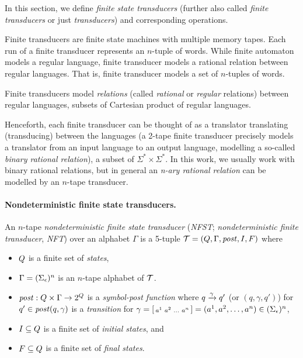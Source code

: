 In this section, we define \emph{finite state transducers} (further also called \emph{finite transducers} or just \emph{transducers}) and corresponding operations.

Finite transducers are finite state machines with multiple memory tapes.
Each run of a finite transducer represents an $n$-tuple of words.
While finite automaton models a regular language, finite transducer models a rational relation between regular languages.
That is, finite transducer models a set of $n$-tuples of words.


Finite transducers model \emph{relations} (called \emph{rational} or \emph{regular} relations) between regular languages, subsets of Cartesian product of regular languages.

Henceforth, each finite transducer can be thought of as a translator translating (transducing) between the languages (a 2-tape finite transducer precisely models a translator from an input language to an output language, modelling a so-called \emph{binary rational relation}), a subset of $\Sigma^* \times \Sigma^*$.
In this work, we usually work with binary rational relations, but in general an \emph{n-ary rational relation} can be modelled by an $n$-tape transducer.


\paragraph{Nondeterministic finite state transducers.}
An $n$-tape \emph{nondeterministic finite state transducer} (\emph{NFST}; \emph{nondeterministic finite transducer}, \emph{NFT}) over an alphabet $\Gamma$ is a 5-tuple $\mathcal{T} = (Q, \Gamma, \mathit{post}, I, F)$ where
\begin{itemize}
    \item $Q$ is a finite set of \emph{states},
    \item $\Gamma = (\Sigma_\epsilon)^n$ is an $n$-tape alphabet of $\mathcal{T}$.
    \item $\mathit{post}: Q \times \Gamma \rightarrow 2^{Q}$ is a \emph{symbol-post function}
    where ${q} \xrightarrow{{\gamma}} {q'}$ (or $(q, \gamma, q')$) for $q' \in \mathit{post}(q, \gamma)$ is a \emph{transition} for $\gamma = \begin{bsmallmatrix} a^1 & a^2 & \ldots & a^n\end{bsmallmatrix} = (a^1, a^2, \ldots, a^n) \in (\Sigma_\epsilon)^n$,
    \item $I \subseteq Q$ is a finite set of \emph{initial states}, and
    \item $F \subseteq Q$ is a finite set of \emph{final states}.
\end{itemize}

